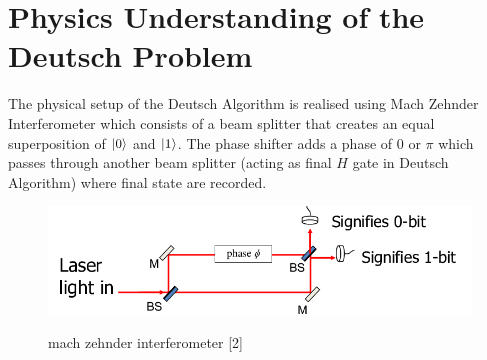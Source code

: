\documentclass[11.5pt, paper=a4]{article}
\theoremstyle{definition}
\numberwithin{theorem}{section}
\begin{document}
\section{Physics Understanding of the Deutsch Problem}

The physical setup of the Deutsch Algorithm is realised using Mach Zehnder Interferometer which consists of a beam splitter that creates an equal superposition of ${\left\vert{0}\right\rangle}$ and ${\left\vert{1}\right\rangle}$. The phase shifter adds a phase of $0$ or $\pi$ which passes through another beam splitter (acting as final $H$ gate in Deutsch Algorithm) where final state are recorded. 

\begin{figure}[H]
    \centering
    \includegraphics[scale=0.5]{mz.png}\\
    \caption{mach zehnder interferometer [2]}
    \label{fig : mach zehnder interferometer}
\end{figure}



\nocite{*}


\end{document}
